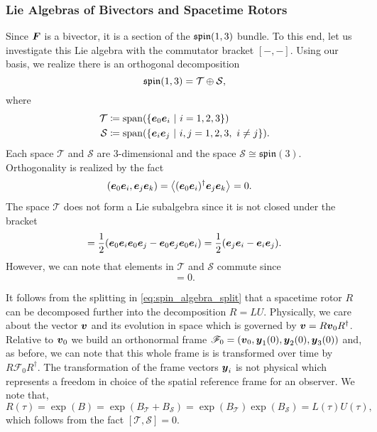 \documentclass[conf]{new-aiaa}
\begin{document}
\subsubsection{Lie Algebras of Bivectors and Spacetime Rotors}

Since $\boldsymbol{F}$ is a bivector, it is a section of the $\mathfrak{spin}(1,3)$ bundle. To this end, let us investigate this Lie algebra with the commutator bracket $[-,-]$. Using our basis, we realize there is an orthogonal decomposition 
\begin{equation}
    \label{eq:spin_algebra_split}
    \mathfrak{spin}(1,3) = \mathcal{T} \oplus \mathcal{S},
\end{equation}
where 
\begin{align}
    \mathcal{T} &\coloneqq \mathrm{span}(\{\boldsymbol{e}_0 \boldsymbol{e}_i ~\vert~ i = 1,2,3\})\\
    \mathcal{S} &\coloneqq \mathrm{span}(\{\boldsymbol{e}_i \boldsymbol{e}_j ~\vert~ i,j = 1,2,3, ~ i\neq j\}).
\end{align}
Each space $\mathcal{T}$ and $\mathcal{S}$ are 3-dimensional and the space $\mathcal{S}\cong \mathfrak{spin}(3)$. Orthogonality is realized by the fact
\begin{align}
    (\boldsymbol{e}_0 \boldsymbol{e}_i, \boldsymbol{e}_j \boldsymbol{e}_k) &= \left\langle(\boldsymbol{e}_0 \boldsymbol{e}_i)^\dagger \boldsymbol{e}_j \boldsymbol{e}_k\right\rangle_{} = 0.
\end{align}
The space $\mathcal{T}$ does not form a Lie subalgebra since it is not closed under the bracket
\begin{equation}
    [\blade{e}_0\blade{e}_i,\blade{e}_0 \blade{e}_j] = \frac{1}{2} (\blade{e}_0 \blade{e}_i \blade{e}_0 \blade{e}_j - \blade{e}_0 \blade{e}_j \blade{e}_0 \blade{e}_i) = \frac{1}{2}(\blade{e}_j \blade{e}_i-\blade{e}_i \blade{e}_j).
\end{equation}
However, we can note that elements in $\mathcal{T}$ and $\mathcal{S}$ commute since
\begin{equation}
[\blade{e}_0 \blade{e}_i,\blade{e}_j \blade{e}_k] = 0.
\end{equation}

It follows from the splitting in \cref{eq:spin_algebra_split} that a spacetime rotor $R$ can be decomposed further into the decomposition $R=LU$. Physically, we care about the vector ${\boldsymbol{v}}$ and its evolution in space which is governed by ${\boldsymbol{v}}=R\boldsymbol{v}_0 R^\dagger$. Relative to $\boldsymbol{v}_0$ we build an orthonormal frame $\mathscr{F}_0=(\boldsymbol{v}_0,\boldsymbol{y}_1(0),\boldsymbol{y}_2(0),\boldsymbol{y}_3(0))$ and, as before, we can note that this whole frame is is transformed over time by $R\mathscr{F}_0 R^\dagger$. The transformation of the frame vectors $\boldsymbol{y}_i$ is not physical which represents a freedom in choice of the spatial reference frame for an observer. We note that,
\begin{equation}
    R(\tau) = \exp(B) = \exp(B_\mathcal{T}+B_\mathcal{S})=\exp(B_\mathcal{T})\exp(B_\mathcal{S})=L(\tau)U(\tau),
\end{equation}
which follows from the fact $[\mathcal{T},\mathcal{S}]=0$. 
\end{document}

